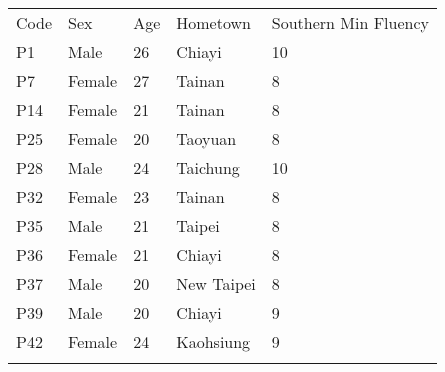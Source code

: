 \begin{flushleft}
\begin{table}[hbt!]
\begin{tabularx}{\textwidth}{|l||X|X|X|X|}
\hhline{~~~~~}\noalign{\vspace*{\doublerulesep}}
\hhline{-||----}
Code&Sex&Age&Hometown&Southern Min Fluency\\
\hhline{=::====}
P1&Male&26&Chiayi&10\\
\hhline{-||----}
P7&Female&27&Tainan&8\\
\hhline{-||----}
P14&Female&21&Tainan&8\\
\hhline{-||----}
P25&Female&20&Taoyuan&8\\
\hhline{-||----}
P28&Male&24&Taichung&10\\
\hhline{-||----}
P32&Female&23&Tainan&8\\
\hhline{-||----}
P35&Male&21&Taipei&8\\
\hhline{-||----}
P36&Female&21&Chiayi&8\\
\hhline{-||----}
P37&Male&20&New Taipei&8\\
\hhline{-||----}
P39&Male&20&Chiayi&9\\
\hhline{-||----}
P42&Female&24&Kaohsiung&9\\
\hhline{-||----}

\end{tabularx}
\end{table}
\end{flushleft}
